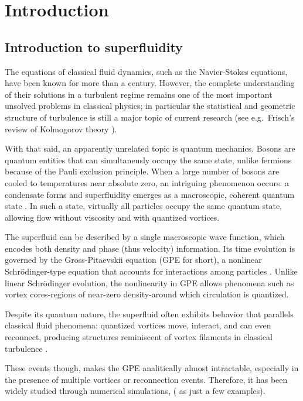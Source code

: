 \chapter{Introduction}

\section{Introduction to superfluidity}

The equations of classical fluid dynamics, such as the Navier-Stokes equations, have been known for more than a century. However, the complete understanding of their solutions in a turbulent regime remains one of the most important unsolved problems in classical physics; in particular the statistical and geometric structure of turbulence is still a major topic of current research (see e.g.\ Frisch's review of Kolmogorov theory \cite{frisch1995turbulence}).

With that said, an apparently unrelated topic is quantum mechanics. Bosons are quantum entities that can simultaneusly occupy the same state, unlike fermions because of the Pauli exclusion principle. When a large number of bosons are cooled to temperatures near absolute zero, an intriguing phenomenon occurs: a condensate forms and superfluidity emerges as a macroscopic, coherent quantum state \cite{pitaevskii2016bose}. In such a state, virtually all particles occupy the same quantum state, allowing flow without viscosity and with quantized vortices.

The superfluid can be described by a single macroscopic wave function, which encodes both density and phase (thus velocity) information. Its time evolution is governed by the Gross-Pitaevskii equation (GPE for short), a nonlinear Schrödinger-type equation that accounts for interactions among particles \cite{gross1961structure,pitaevskii1961vortex}. Unlike linear Schrödinger evolution, the nonlinearity in GPE allows phenomena such as vortex cores-regions of near-zero density-around which circulation is quantized.

Despite its quantum nature, the superfluid often exhibits behavior that parallels classical fluid phenomena: quantized vortices move, interact, and can even reconnect, producing structures reminiscent of vortex filaments in classical turbulence \cite{fetter2009rotating}. 

These events though, makes the GPE analitically almost intractable, especially in the presence of multiple vortices or reconnection events. Therefore, it has been widely studied through numerical simulations, (\cite{CZ12,CZ18,CZ21} as just a few examples). 

